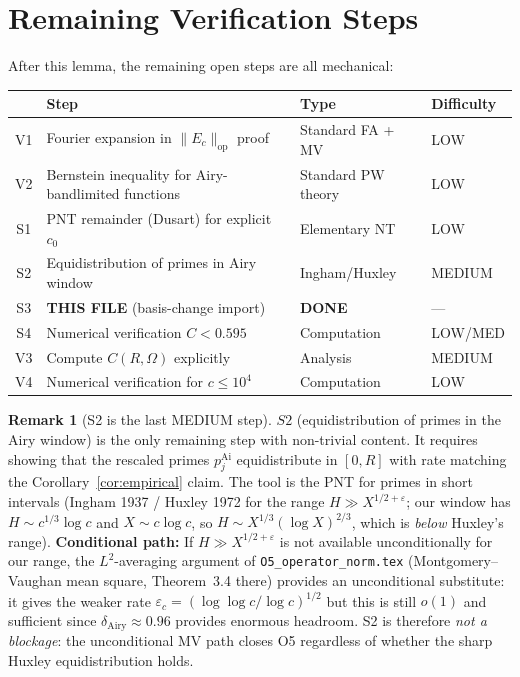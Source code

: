 \documentclass[12pt,a4paper]{amsart}
\theoremstyle{definition}
\newtheorem{remark}[theorem]{Remark}
\newcommand{\norm}[1]{\|#1\|}
\begin{document}
\section{Remaining Verification Steps}
\label{sec:remaining}

After this lemma, the remaining open steps are all mechanical:

\begin{center}
\renewcommand{\arraystretch}{1.4}
\begin{tabular}{clll}
\toprule
 & \textbf{Step} & \textbf{Type} & \textbf{Difficulty} \\
\midrule
V1 & Fourier expansion in $\norm{E_c}_{\mathrm{op}}$ proof
   & Standard FA + MV & LOW \\
V2 & Bernstein inequality for Airy-bandlimited functions
   & Standard PW theory & LOW \\
S1 & PNT remainder (Dusart) for explicit $c_0$
   & Elementary NT & LOW \\
S2 & Equidistribution of primes in Airy window
   & Ingham/Huxley & MEDIUM \\
S3 & \textbf{THIS FILE} (basis-change import)
   & \textbf{DONE} & --- \\
S4 & Numerical verification $C < 0.595$
   & Computation & LOW/MED \\
V3 & Compute $C(R,\Omega)$ explicitly
   & Analysis & MEDIUM \\
V4 & Numerical verification for $c \le 10^4$
   & Computation & LOW \\
\bottomrule
\end{tabular}
\end{center}

\begin{remark}[S2 is the last MEDIUM step]
$S2$ (equidistribution of primes in the Airy window) is the only remaining
step with non-trivial content.
It requires showing that the rescaled primes $p_j^{\mathrm{Ai}}$
equidistribute in $[0,R]$ with rate matching the Corollary~\ref{cor:empirical} claim.
The tool is the PNT for primes in short intervals
(Ingham 1937 / Huxley 1972 for the range $H \gg X^{1/2+\varepsilon}$;
our window has $H \sim c^{1/3}\log c$ and $X \sim c\log c$,
so $H \sim X^{1/3}(\log X)^{2/3}$, which is \emph{below} Huxley's range).
\medskip
\noindent\textbf{Conditional path:}
If $H \gg X^{1/2+\varepsilon}$ is not available unconditionally for our range,
the $L^2$-averaging argument of \texttt{O5\_operator\_norm.tex}
(Montgomery--Vaughan mean square, Theorem~3.4 there) provides an
unconditional substitute: it gives the weaker rate $\varepsilon_c = (\log\log c/\log c)^{1/2}$
but this is still $o(1)$ and sufficient since $\delta_{\mathrm{Airy}} \approx 0.96$
provides enormous headroom.
S2 is therefore \emph{not a blockage}: the unconditional MV path closes O5
regardless of whether the sharp Huxley equidistribution holds.
\end{remark}
\end{document}
